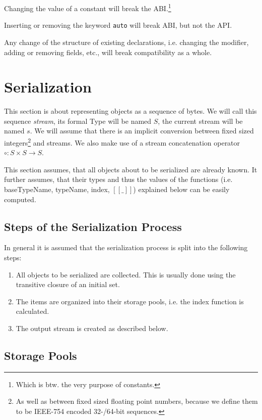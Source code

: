 \documentclass[a4paper,10pt]{article}
\newcommand{\den}[1]{[\![#1]\!]}
\begin{document}
Changing the value of a constant will break the ABI.\footnote{Which is btw. the very purpose of constants.}

Inserting or removing the keyword \texttt{auto} will break ABI, but not the API.

Any change of the structure of existing declarations, i.e. changing the modifier, adding or removing fields, etc., will break compatibility as a whole.

\section{Serialization}

This section is about representing objects as a sequence of bytes. We will call this sequence \textit{stream}, its formal Type will be named $S$, the current stream will be named $s$. We will assume that there is an implicit conversion between fixed sized integers\footnote{As well as between fixed sized floating point numbers, because we define them to be IEEE-754 encoded 32-/64-bit sequences.} and streams. We also make use of a stream concatenation operator $\circ : S \times S → S$.

This section assumes, that all objects about to be serialized are already known. It further assumes, that their types and thus the values of the functions (i.e. baseTypeName, typeName, index, $\den{\_}$) explained below can be easily computed.


\subsection{Steps of the Serialization Process}

In general it is assumed that the serialization process is split into the following steps:
\begin{enumerate}
 \item All objects to be serialized are collected. This is usually done using the transitive closure of an initial set.
 
 \item The items are organized into their storage pools, i.e. the index function is calculated.
 
 \item The output stream is created as described below.
\end{enumerate}

\subsection{Storage Pools}
\end{document}
